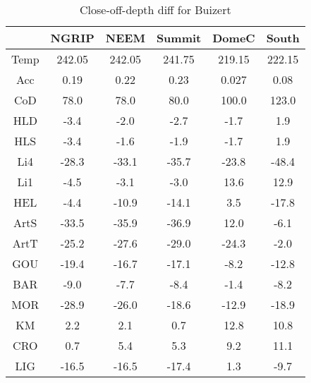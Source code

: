 \begin{table}[h]
\centering
\caption{Close-off-depth diff for Buizert}
\label{table:5}
\begin{tabular}{cccccc}
\toprule
{} & {NGRIP} & {NEEM} & {Summit} & {DomeC} & {South} \\
\midrule
Temp & 242.05 & 242.05 & 241.75 & 219.15 & 222.15 \\
Acc & 0.19 & 0.22 & 0.23 & 0.027 & 0.08 \\
CoD & 78.0 & 78.0 & 80.0 & 100.0 & 123.0 \\
HLD & -3.4 & -2.0 & -2.7 & -1.7 & 1.9 \\
HLS & -3.4 & -1.6 & -1.9 & -1.7 & 1.9 \\
Li4 & -28.3 & -33.1 & -35.7 & -23.8 & -48.4 \\
Li1 & -4.5 & -3.1 & -3.0 & 13.6 & 12.9 \\
HEL & -4.4 & -10.9 & -14.1 & 3.5 & -17.8 \\
ArtS & -33.5 & -35.9 & -36.9 & 12.0 & -6.1 \\
ArtT & -25.2 & -27.6 & -29.0 & -24.3 & -2.0 \\
GOU & -19.4 & -16.7 & -17.1 & -8.2 & -12.8 \\
BAR & -9.0 & -7.7 & -8.4 & -1.4 & -8.2 \\
MOR & -28.9 & -26.0 & -18.6 & -12.9 & -18.9 \\
KM & 2.2 & 2.1 & 0.7 & 12.8 & 10.8 \\
CRO & 0.7 & 5.4 & 5.3 & 9.2 & 11.1 \\
LIG & -16.5 & -16.5 & -17.4 & 1.3 & -9.7 \\
\bottomrule
\end{tabular}
\end{table}
